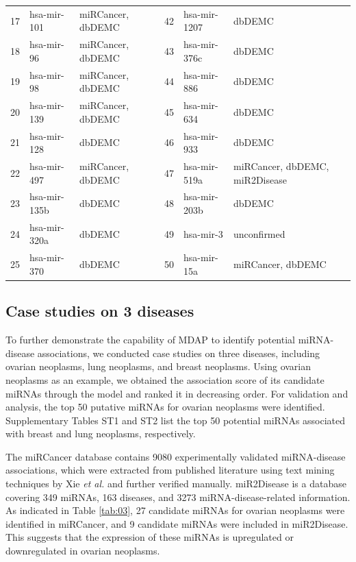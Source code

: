 \documentclass[journal,twoside,web]{ieeecolor}
\begin{document}
\begin{table}[tb]
\begin{threeparttable}[b]
\begin{tabular}{p{1.5cm}<{\centering} p{2.5cm}<{\raggedright} p{4.5cm}<{\raggedright} | p{1.5cm}<{\centering}   p{2.5cm}<{\raggedright} p{4.5cm}<{\raggedright}}
            17 & hsa-mir-101 & miRCancer, dbDEMC & 42 & hsa-mir-1207	 & dbDEMC\\
            18 & hsa-mir-96 & miRCancer, dbDEMC & 43	 & hsa-mir-376c	 & dbDEMC\\
            19 & hsa-mir-98 & miRCancer, dbDEMC & 44	 & hsa-mir-886	 & dbDEMC\\
            20 & hsa-mir-139 & miRCancer, dbDEMC & 45 & hsa-mir-634	 & dbDEMC\\
            21 & hsa-mir-128 & dbDEMC & 46 & hsa-mir-933 & dbDEMC\\
            22 & hsa-mir-497 & miRCancer, dbDEMC & 47 & hsa-mir-519a	& miRCancer, dbDEMC, miR2Disease\\
            23 & hsa-mir-135b & dbDEMC & 48 & hsa-mir-203b & dbDEMC\\
            24 & hsa-mir-320a &	dbDEMC & 49 & hsa-mir-3 & unconfirmed\\
            25 & hsa-mir-370 & dbDEMC & 50 & hsa-mir-15a & miRCancer, dbDEMC\\
			\hline
		\end{tabular}
	\end{threeparttable}
\end{table}

\subsection{Case studies on 3 diseases}
To further demonstrate the capability of MDAP to identify potential miRNA-disease associations, we conducted case studies on three diseases, including ovarian neoplasms, lung neoplasms, and breast neoplasms. Using ovarian neoplasms as an example, we obtained the association score of its candidate miRNAs through the model and ranked it in decreasing order. For validation and analysis, the top 50 putative miRNAs for ovarian neoplasms were identified. Supplementary Tables ST1 and ST2 list the top 50 potential miRNAs associated with breast and lung neoplasms, respectively.

The miRCancer database contains 9080 experimentally validated miRNA-disease associations, which were extracted from published literature using text mining techniques by Xie {\it et al.} \cite{2013miRCancer} and further verified manually. miR2Disease is a database covering 349 miRNAs, 163 diseases, and 3273 miRNA-disease-related information. As indicated in Table \ref{tab:03}, 27 candidate miRNAs for ovarian neoplasms were identified in miRCancer, and 9 candidate miRNAs were included in miR2Disease. This suggests that the expression of these miRNAs is upregulated or downregulated in ovarian neoplasms.
\end{document}

